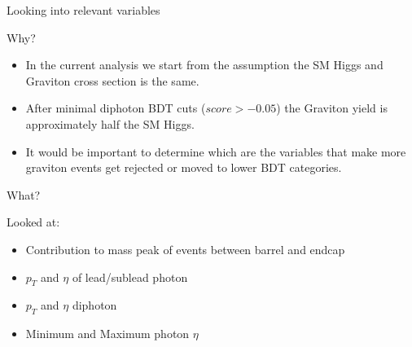 \documentclass[8pt]{beamer}
\begin{document}
\begin{frame}{Looking into relevant variables}

  \begin{block}{Why?}
   
    \begin{itemize}
      \item In the current analysis we start from the assumption the SM Higgs and Graviton cross section is the same.
      \item After minimal diphoton BDT cuts ($score > -0.05$) the Graviton yield is approximately half the SM Higgs.
      \item It would be important to determine which are the variables that make more graviton events get rejected or
      moved to lower BDT categories.
    \end{itemize}
   
  \end{block}

  \begin{block}{What?}
   
    Looked at:
    \begin{itemize}
      \item Contribution to mass peak of events between barrel and endcap
      \item $p_T$ and $\eta$ of lead/sublead photon
      \item $p_T$ and $\eta$ diphoton
      \item Minimum and Maximum photon $\eta$
    \end{itemize}
   
  \end{block}
  
\end{frame}
\end{document}
